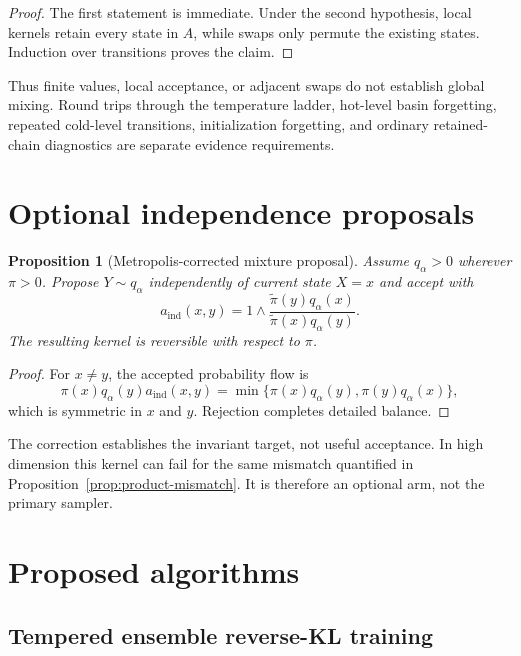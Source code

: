 \documentclass[11pt]{article}
\newtheorem{proposition}[theorem]{Proposition}
\theoremstyle{definition}
\theoremstyle{remark}
\newcommand{\1}{\mathbf{1}}
\begin{document}
\begin{proof}
The first statement is immediate.  Under the second hypothesis, local kernels
retain every state in $A$, while swaps only permute the existing states.
Induction over transitions proves the claim.
\end{proof}

Thus finite values, local acceptance, or adjacent swaps do not establish global
mixing.  Round trips through the temperature ladder, hot-level basin forgetting, repeated
cold-level transitions, initialization forgetting, and ordinary retained-chain
diagnostics are separate evidence requirements.

\section{Optional independence proposals}

\begin{proposition}[Metropolis-corrected mixture proposal]
\label{prop:mixture-independence-mh}
Assume $q_\alpha>0$ wherever $\pi>0$.  Propose $Y\sim q_\alpha$ independently
of current state $X=x$ and accept with
\begin{equation}
 a_{\mathrm{ind}}(x,y)
 =1\wedge
 \frac{\widetilde\pi(y)q_\alpha(x)}
      {\widetilde\pi(x)q_\alpha(y)}.
 \label{eq:independence-ratio}
\end{equation}
The resulting kernel is reversible with respect to $\pi$.
\end{proposition}

\begin{proof}
For $x\neq y$, the accepted probability flow is
\[
 \pi(x)q_\alpha(y)a_{\mathrm{ind}}(x,y)
 =\min\{\pi(x)q_\alpha(y),\pi(y)q_\alpha(x)\},
\]
which is symmetric in $x$ and $y$.  Rejection completes detailed balance.
\end{proof}

The correction establishes the invariant target, not useful acceptance.  In
high dimension this kernel can fail for the same mismatch quantified in
Proposition~\ref{prop:product-mismatch}.  It is therefore an optional arm, not
the primary sampler.

\section{Proposed algorithms}

\subsection{Tempered ensemble reverse-KL training}
\end{document}
